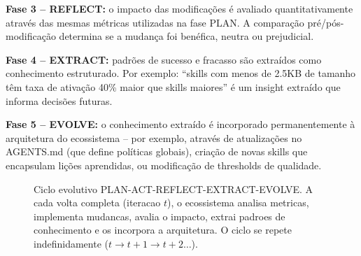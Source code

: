 \documentclass[12pt,a4paper,sumario=tradicional,openany]{abntex2}
\begin{document}
\textbf{Fase 3 -- REFLECT:} o impacto das modificações é avaliado quantitativamente através das mesmas métricas utilizadas na fase PLAN. A comparação pré/pós-modificação determina se a mudança foi benéfica, neutra ou prejudicial.

\textbf{Fase 4 -- EXTRACT:} padrões de sucesso e fracasso são extraídos como conhecimento estruturado. Por exemplo: ``skills com menos de 2.5KB de tamanho têm taxa de ativação 40\% maior que skills maiores'' é um insight extraído que informa decisões futuras.

\textbf{Fase 5 -- EVOLVE:} o conhecimento extraído é incorporado permanentemente à arquitetura do ecossistema -- por exemplo, através de atualizações no AGENTS.md (que define políticas globais), criação de novas skills que encapsulam lições aprendidas, ou modificação de thresholds de qualidade.

\begin{figure}[H]
\centering
{}
\caption{Ciclo evolutivo PLAN-ACT-REFLECT-EXTRACT-EVOLVE. A cada volta completa (iteracao $t$), o ecossistema analisa metricas, implementa mudancas, avalia o impacto, extrai padroes de conhecimento e os incorpora a arquitetura. O ciclo se repete indefinidamente ($t \to t+1 \to t+2 \dots$).}
\label{fig:evolution-cycle}
\end{figure}
\end{document}

